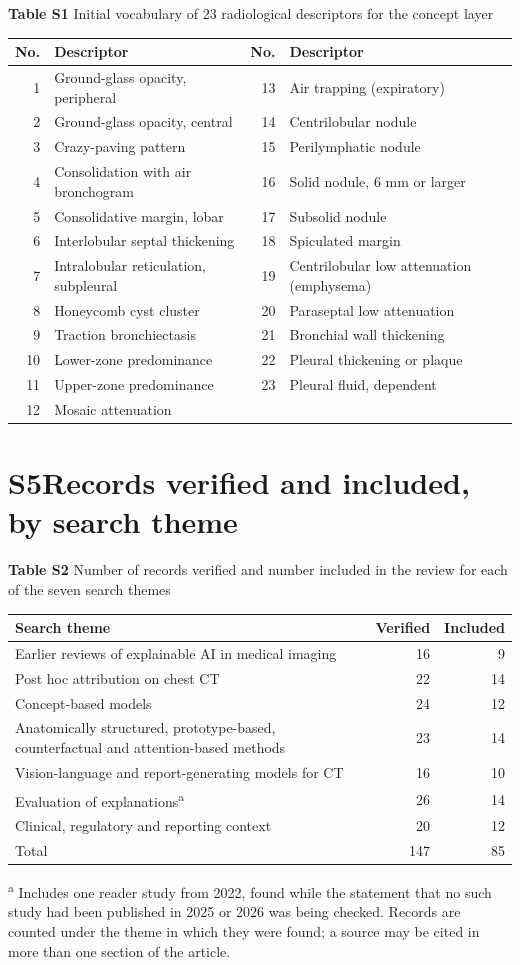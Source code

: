 \documentclass[10pt,a4paper]{article}
\theoremstyle{definition}\newtheorem{definition}{Definition S\!}
\theoremstyle{remark}\newtheorem{remark}{Remark S\!}
\begin{document}
\begin{center}
\textbf{Table S1} Initial vocabulary of 23 radiological descriptors for the concept layer\\[4pt]
\begin{tabular}{rl@{\hspace{10mm}}rl}
\toprule
No. & Descriptor & No. & Descriptor\\
\midrule
1 & Ground-glass opacity, peripheral & 13 & Air trapping (expiratory)\\
2 & Ground-glass opacity, central & 14 & Centrilobular nodule\\
3 & Crazy-paving pattern & 15 & Perilymphatic nodule\\
4 & Consolidation with air bronchogram & 16 & Solid nodule, 6 mm or larger\\
5 & Consolidative margin, lobar & 17 & Subsolid nodule\\
6 & Interlobular septal thickening & 18 & Spiculated margin\\
7 & Intralobular reticulation, subpleural & 19 & Centrilobular low attenuation (emphysema)\\
8 & Honeycomb cyst cluster & 20 & Paraseptal low attenuation\\
9 & Traction bronchiectasis & 21 & Bronchial wall thickening\\
10 & Lower-zone predominance & 22 & Pleural thickening or plaque\\
11 & Upper-zone predominance & 23 & Pleural fluid, dependent\\
12 & Mosaic attenuation & & \\
\bottomrule
\end{tabular}
\end{center}

\newpage
\section*{S5\quad Records verified and included, by search theme}

\begin{center}
\textbf{Table S2} Number of records verified and number included in the review for each of the seven search themes\\[4pt]
\begin{tabular}{p{105mm}rr}
\toprule
Search theme & Verified & Included\\
\midrule
Earlier reviews of explainable AI in medical imaging & 16 & 9\\
Post hoc attribution on chest CT & 22 & 14\\
Concept-based models & 24 & 12\\
Anatomically structured, prototype-based, counterfactual and attention-based methods & 23 & 14\\
Vision-language and report-generating models for CT & 16 & 10\\
Evaluation of explanations\textsuperscript{a} & 26 & 14\\
Clinical, regulatory and reporting context & 20 & 12\\
\midrule
Total & 147 & 85\\
\bottomrule
\end{tabular}
\end{center}

\textsuperscript{a} Includes one reader study from 2022, found while the statement that no such study had been published in 2025 or 2026 was being checked. Records are counted under the theme in which they were found; a source may be cited in more than one section of the article.
\end{document}
